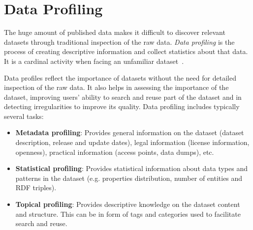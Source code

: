\section{Data Profiling}\label{sec:dataProfiling}

The huge amount of published data makes it difficult to discover relevant datasets through traditional inspection of the raw data. \textit{Data profiling} is the process of creating descriptive information and collect statistics about that data. It is a cardinal activity when facing an unfamiliar dataset~\cite{Li:WISM:12, Kimball:DWL:98}.

Data profiles reflect the importance of datasets without the need for detailed inspection of the raw data.  It also helps in assessing the importance of the dataset, improving users' ability to search and reuse part of the dataset and in detecting irregularities to improve its quality. Data profiling includes typically several tasks:
\begin{itemize}
  \item \textbf{Metadata profiling}: Provides general information on the dataset (dataset description, release and update dates), legal information (license information, openness), practical information (access points, data dumps), etc.
  \item \textbf{Statistical profiling}: Provides statistical information about data types and patterns in the dataset (e.g. properties distribution, number of entities and RDF triples).
  \item \textbf{Topical profiling}: Provides descriptive knowledge on the dataset content and structure. This can be in form of tags and categories used to facilitate search and reuse.
\end{itemize}

